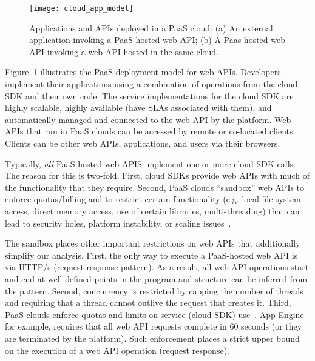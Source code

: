 \begin{figure}
\centering
\texttt{[image: cloud\_app\_model]}
\caption{Applications and APIs deployed in a PaaS cloud: (a) An external application invoking a PaaS-hosted web API;
(b) A Paas-hosted web API invoking a web API hosted in the same cloud.}
\label{fig:cloud_app_model}
\end{figure}

Figure~\ref{fig:cloud_app_model} illustrates the PaaS deployment model for web APIs.
Developers implement their applications using a combination of operations
from the cloud SDK and their own code.  The service implementations for the 
cloud SDK are highly scalable, highly available (have SLAs associated with them),
and automatically managed and connected to the web API by the platform.
Web APIs that run in PaaS clouds can be accessed by remote or co-located clients.
Clients can be other web APIs, applications, and users via their browsers.

Typically, \textit{all} PaaS-hosted web APIS implement one or more
cloud SDK calls.  The reason for this is two-fold.  First, 
cloud SDKs provide web APIs with much of the functionality that they require.
Second, PaaS clouds ``sandbox'' web APIs to enforce quotas/billing
and to restrict certain functionality
(e.g. local file system access, direct memory access, use of certain libraries, multi-threading) that can lead to security holes, platform instability, or scaling issues~\cite{gae-sandbox}.

The sandbox places other important restrictions on web APIs that additionally
simplify our analysis.
First, the only way to execute a PaaS-hosted web API is via HTTP/s (request-response 
pattern).  As a result, 
all web API operations start and end at well defined points in the program and 
structure can be inferred from the pattern.  Second,
concurrency is restricted by capping the number of threads
and requiring that a thread cannot outlive the request
that creates it.  Third, PaaS clouds enforce quotas and limits on service
(cloud SDK) use~\cite{azure-limits,gae-quotas}.
App Engine for example, requires that all web API requests complete in 60 seconds (or they are terminated by the platform).  Such enforcement places a strict upper bound on the
execution of a web API operation (request response).

